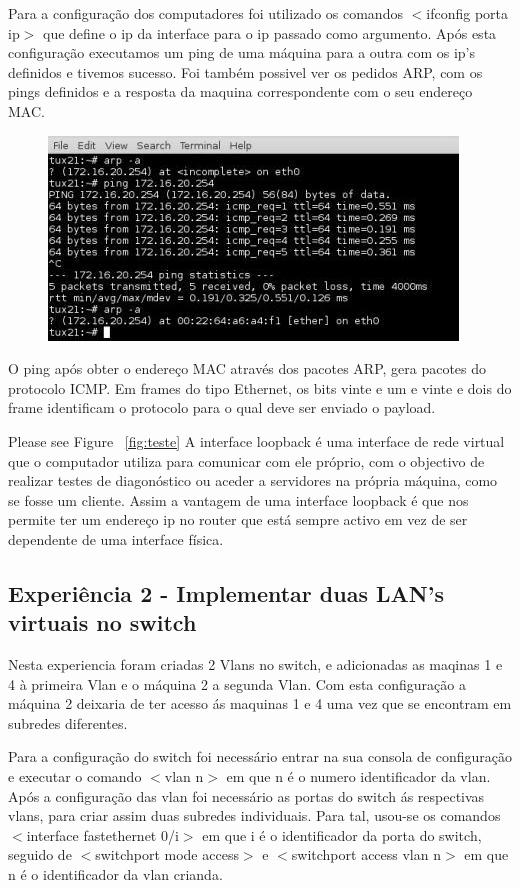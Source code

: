 \documentclass[a4paper]{article}
\begin{document}
Para a configuração dos computadores foi utilizado os comandos $<$ifconfig porta ip$>$ que define o ip da interface para o ip passado como argumento. Após esta configuração executamos um ping de uma máquina para a outra com os ip’s definidos e tivemos sucesso. Foi também possivel ver os pedidos ARP, com os pings definidos e a resposta da maquina correspondente com o seu endereço MAC.

\begin{figure}[h!]
\centering
\includegraphics[scale=0.5]{res/image1.jpg}
\end{figure}

O ping após obter o endereço MAC através dos pacotes ARP, gera pacotes do protocolo ICMP. Em frames do tipo Ethernet, os bits vinte e um e vinte e dois do frame identificam o protocolo para o qual deve ser enviado o payload.

\pagebreak

Please see Figure ~\autoref{fig:teste}
A interface loopback é uma interface de rede virtual que o computador utiliza para comunicar com ele próprio, com o objectivo de realizar testes de diagonóstico ou aceder a servidores na própria máquina, como se fosse um cliente. Assim a vantagem de uma interface loopback é que nos permite ter um endereço ip no router que está sempre activo em vez de ser dependente de uma interface física.

\subsection{Experiência 2 - Implementar duas LAN's virtuais no switch}
Nesta experiencia foram criadas 2 Vlans no switch, e adicionadas as maqinas 1 e 4 à primeira Vlan e o máquina 2 a segunda Vlan. Com esta configuração a máquina 2 deixaria de ter acesso ás maquinas 1 e 4 uma vez que se encontram em subredes diferentes.


Para a configuração do switch foi necessário entrar na  sua consola de configuração e executar o comando $<$vlan n$>$ em que n é o numero identificador da vlan. Após a configuração das vlan foi necessário as portas do switch ás respectivas vlans, para criar assim duas subredes individuais. Para tal, usou-se os comandos $<$interface fastethernet 0/i$>$ em que i é o identificador da porta do switch, seguido de $<$switchport mode access$>$ e $<$switchport access vlan n$>$ em que n é o identificador da vlan crianda.
\end{document}
